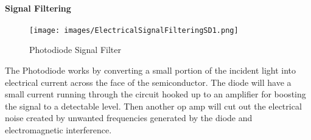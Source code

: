 \paragraph{Signal Filtering}

\begin{figure}[H]
    \caption{Photodiode Signal Filter}
    \centering
    \texttt{[image: images/ElectricalSignalFilteringSD1.png]}
\end{figure}


The Photodiode works by converting a small portion of the incident light into electrical current across the face of the semiconductor. The diode will have a small current running through the circuit hooked up to an amplifier for boosting the signal to a detectable level. Then another op amp will cut out the electrical noise created by unwanted frequencies generated by the diode and electromagnetic interference.

